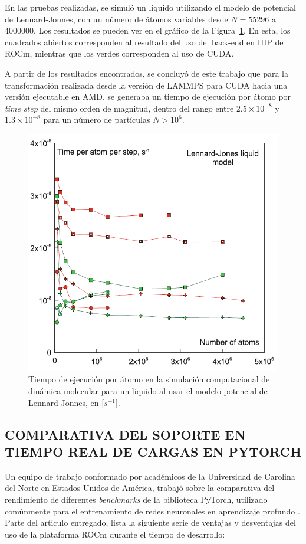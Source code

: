 En las pruebas realizadas, se simuló un liquido utilizando el modelo de potencial de Lennard-Jonnes, con un número de átomos variables desde $N = 55296$ a \(4000000\). Los resultados se pueden ver en el gráfico de la Figura~\ref{fig:5}. En esta, los cuadrados abiertos corresponden al resultado del uso del back-end en HIP de ROCm, mientras que los verdes corresponden al uso de CUDA.

A partir de los resultados encontrados, se concluyó de este trabajo que para la transformación realizada desde la versión de LAMMPS para CUDA hacia una versión ejecutable en AMD, se generaba un tiempo de ejecución por átomo por \textit{time step} del mismo orden de magnitud, dentro del rango entre $2.5 \times 10^{-8}$ y $1.3 \times 10^{-8}$ para un número de partículas $N > 10^6$.

\begin{figure}[ht]
    \centering
    \includegraphics[height=.6\textwidth]{Figures/grap2.png}
    \caption{Tiempo de ejecución por átomo en la simulación computacional de dinámica molecular para un liquido al usar el modelo potencial de Lennard-Jonnes, en [$s^{-1}$].}
    \label{fig:5}
\end{figure}


\subsection{COMPARATIVA DEL SOPORTE EN TIEMPO REAL DE CARGAS EN PYTORCH}

Un equipo de trabajo conformado por académicos de la Universidad de Carolina del Norte en Estados Unidos de América, trabajó sobre la comparativa del rendimiento de diferentes \textit{benchmarks} de la biblioteca PyTorch, utilizado comúnmente para el entrenamiento de redes neuronales en aprendizaje profundo \cite{pytorch}.
Parte del articulo entregado, lista la siguiente serie de ventajas y desventajas del uso de la plataforma ROCm durante el tiempo de desarrollo:

